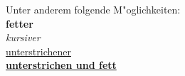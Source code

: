 \documentclass[a4paper, pdftex, 12pt, ngerman]{article}
\begin{document}
Unter anderem folgende M"oglichkeiten:\\
\textbf{fetter}\\
\textit{kursiver}\\
\underline{unterstrichener}\\
\underline{\textbf{unterstrichen und fett}}\\
\end{document}
